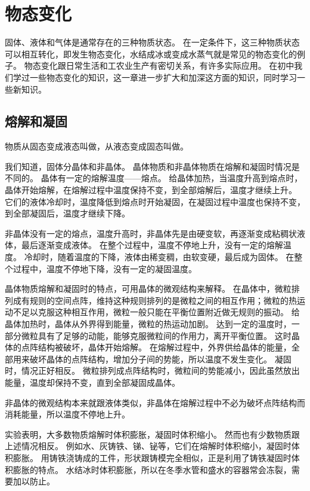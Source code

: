 \chapter{物态变化}
固体、液体和气体是通常存在的三种物质状态。
在一定条件下，这三种物质状态可以相互转化，即发生物态变化，水结成冰或变成水蒸气就是常见的物态变化的例子。
物态变化跟日常生活和工农业生产有密切关系，有许多实际应用。
在初中我们学过一些物态变化的知识，这一章进一步扩大和加深这方面的知识，同时学习一些新知识。

\section{熔解和凝固}
物质从固态变成液态叫做，从液态变成固态叫做。

我们知道，固体分晶体和非晶体。
晶体物质和非晶体物质在熔解和凝固时情况是不同的。
晶体有一定的熔解温度——熔点。
给晶体加热，当温度升高到熔点时，晶体开始熔解，在熔解过程中温度保持不变，到全部熔解后，温度才继续上升。
它们的液体冷却时，温度降低到熔点时开始凝固，在凝固过程中温度也保持不变，到全部凝固后，温度才继续下降。

非晶体没有一定的熔点，温度升高时，非晶体先是由硬变软，再逐渐变成粘稠状液体，最后逐渐变成液体。
在整个过程中，温度不停地上升，没有一定的熔解温度。
冷却时，随着温度的下降，液体由稀变稠，由软变硬，最后成为固体。
在整个过程中，温度不停地下降，没有一定的凝固温度。

晶体物质熔解和凝固时的特点，可用晶体的微观结构来解释。
在晶体中，微粒排列成有规则的空间点阵，维持这种规则排列的是微粒之间的相互作用；微粒的热运动不足以克服这种相互作用，微粒一般只能在平衡位置附近做无规则的振动。
给晶体加热时，晶体从外界得到能量，微粒的热运动加剧。
达到一定的温度时，一部分微粒具有了足够的动能，能够克服微粒间的作用力，离开平衡位置。
这时晶体的点阵结构被破坏，晶体开始熔解。
在熔解过程中，外界供给晶体的能量，全部用来破坏晶体的点阵结构，增加分子间的势能，所以温度不发生变化。
凝固时，情况正好相反。
微粒排列成点阵结构时，微粒间的势能减小，因此虽然放出能量，温度却保持不变，直到全部凝固成晶体。

非晶体的微观结构本来就跟液体类似，非晶体在熔解过程中不必为破坏点阵结构而消耗能量，所以温度不停地上升。

实验表明，大多数物质熔解时体积膨胀，凝固时体积缩小。
然而也有少数物质跟上述情况相反。
例如水、灰铸铁、锑、铋等，它们在熔解时体积缩小，凝固时体积膨胀。
用铸铁浇铸成的工件，形状跟铸模完全相似，正是利用了铸铁凝固时体积膨胀的特点。
水结冰时体积膨胀，所以在冬季水管和盛水的容器常会冻裂，需要加以防止。

